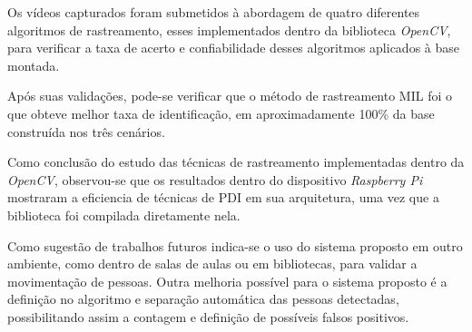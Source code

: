 \documentclass[12pt,oneside,a4paper,chapter=TITLE,section=TITLE,sumario=tradicional]{abntex2}
\begin{document}
Os vídeos capturados foram submetidos à abordagem de quatro diferentes algoritmos de rastreamento, esses implementados dentro da biblioteca \textit{OpenCV}, para verificar a taxa de acerto e confiabilidade desses algoritmos aplicados à base montada.

Após suas validações, pode-se verificar que o método de rastreamento MIL foi o que obteve melhor taxa de identificação, em aproximadamente 100\% da base construída nos três cenários.

Como conclusão do estudo das técnicas de rastreamento implementadas dentro da \textit{OpenCV}, observou-se que os resultados dentro do dispositivo \textit{Raspberry Pi} mostraram a eficiencia de técnicas de PDI em sua arquitetura, uma vez que a biblioteca foi compilada diretamente nela. 

Como sugestão de trabalhos futuros indica-se o uso do sistema proposto em outro ambiente, como dentro de salas de aulas ou em bibliotecas, para validar a movimentação de pessoas.
Outra melhoria possível para o sistema proposto é a definição no algoritmo e separação automática das pessoas detectadas, possibilitando assim a contagem e definição de possíveis falsos positivos.




\end{document}
